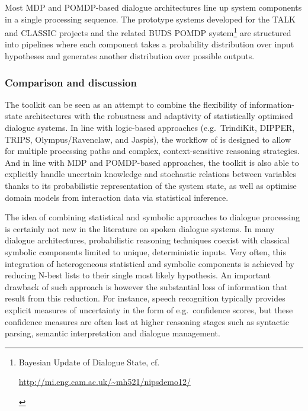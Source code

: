Most MDP and POMDP-based dialogue architectures line up system components in a single processing sequence. The prototype systems developed for the TALK and CLASSIC projects \citep{Henderson:2008,Lemon:2012} and the related BUDS POMDP system\footnote{Bayesian Update of Dialogue State, cf. \begin{scriptsize}\url{http://mi.eng.cam.ac.uk/~mh521/nipsdemo12/}\end{scriptsize}} are structured into pipelines where each component takes a probability distribution over input hypotheses and generates another distribution over possible outputs.  



\subsubsection*{Comparison and discussion}

The \opendial{} toolkit can be seen as an attempt to combine the flexibility of information-state architectures with the robustness and adaptivity of statistically optimised dialogue systems.  In line with logic-based approaches (e.g.\ TrindiKit, DIPPER, TRIPS, Olympus/Ravenclaw, and Jaspis), the workflow of \opendial{} is designed to allow for multiple processing paths and complex, context-sensitive reasoning strategies.  And in line with MDP and POMDP-based approaches, the toolkit is also able to explicitly handle uncertain knowledge and stochastic relations between variables thanks to its probabilistic representation of the system state, as well as optimise domain models from interaction data via statistical inference.  

The idea of combining statistical and symbolic approaches to dialogue processing is certainly not new in the literature on spoken dialogue systems.  In many dialogue architectures, probabilistic reasoning techniques coexist with classical symbolic components limited to unique, deterministic inputs. Very often, this integration of heterogeneous statistical and symbolic components is achieved by reducing N-best lists to their single most likely hypothesis. An important drawback of such approach is however the substantial loss of information that result from this reduction. For instance, speech recognition typically provides explicit measures of uncertainty in the form of e.g.\ confidence scores, but these confidence measures are often lost at higher reasoning stages such as syntactic parsing, semantic interpretation and dialogue management. 

